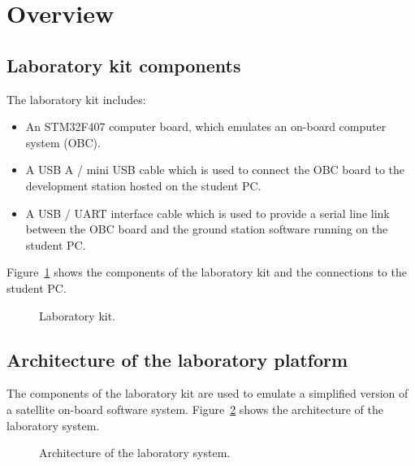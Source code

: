 \chapter*{Overview}\label{ch:overview}

\section*{Laboratory kit components}

The laboratory kit includes:
\begin{itemize}
\item	An STM32F407 computer board, which emulates an on-board computer system (OBC).
\item	A USB A / mini USB cable which is used to connect the OBC board to the development station hosted on the student PC.
\item	A USB / UART interface cable which is used to provide a serial line link between the OBC board and the ground station software running on the student PC.
\end{itemize}

Figure~\ref{fig:kit} shows the components of the laboratory kit and the connections to the student PC.

\begin{figure}[h]
            \caption{Laboratory kit.}
            \label{fig:kit}
\end{figure}

\section*{Architecture of the laboratory platform}

The components of the laboratory kit are used to emulate a simplified version of a satellite on-board software system. Figure~\ref{fig:architecture} shows the architecture of the laboratory system.

\begin{figure}[h]
            \caption{Architecture of the laboratory system.}
            \label{fig:architecture}
\end{figure}

